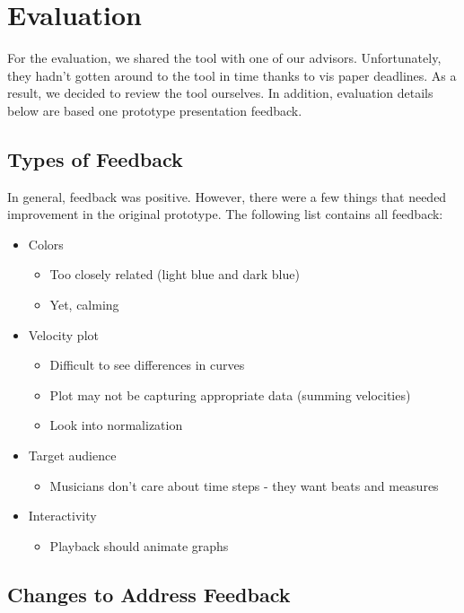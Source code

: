 \documentclass[journal]{vgtc}                %
\begin{document}
\section{Evaluation}

For the evaluation, we shared the tool with one of our advisors.
Unfortunately, they hadn't gotten around to the tool in time
thanks to vis paper deadlines. As a result, we decided to review
the tool ourselves. In addition, evaluation details below are
based one prototype presentation feedback.

\subsection{Types of Feedback}

In general, feedback was positive. However, there were a few things
that needed improvement in the original prototype. The following
list contains all feedback:

\begin{itemize}
  \item Colors
  \begin{itemize}
    \item Too closely related (light blue and dark blue)
    \item Yet, calming
  \end{itemize}
  \item Velocity plot
  \begin{itemize}
    \item Difficult to see differences in curves
    \item Plot may not be capturing appropriate data (summing velocities)
    \item Look into normalization
  \end{itemize}
  \item Target audience
  \begin{itemize}
    \item Musicians don't care about time steps - they want beats and measures
  \end{itemize}
  \item Interactivity
  \begin{itemize}
    \item Playback should animate graphs
  \end{itemize}
\end{itemize}

\subsection{Changes to Address Feedback}
\end{document}
